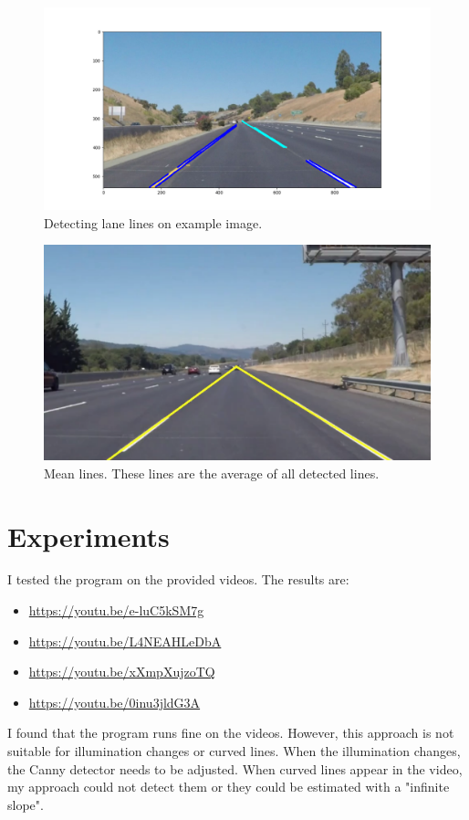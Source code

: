 \documentclass[]{article}
\begin{document}
\begin{figure}
\centering
\includegraphics[width=\linewidth]{figure_1}
\caption{Detecting lane lines on example image.}
\label{fig:figure_1}
\end{figure}

\begin{figure}
\centering
\includegraphics[width=0.7\linewidth]{mean}
\caption{Mean lines. These lines are the average of all detected lines.}
\label{fig:mean}
\end{figure}

\section{Experiments}

I tested the program on the provided videos. The results are:

\begin{itemize}
	\item \url{https://youtu.be/e-luC5kSM7g}
    \item \url{https://youtu.be/L4NEAHLeDbA}
    \item \url{https://youtu.be/xXmpXujzoTQ}
    \item \url{https://youtu.be/0inu3jldG3A}
\end{itemize}

I found that the program runs fine on the videos. However, this approach is not suitable for illumination changes or curved lines. When the illumination changes, the Canny detector needs to be adjusted. When curved lines appear in the video, my approach could not detect them or they could be estimated with a "infinite slope". 
\end{document}
